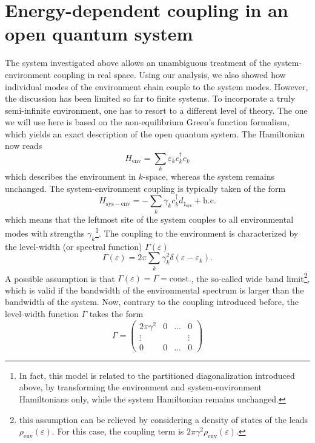 \documentclass{article}
\newcommand{\pdagger}{{\phantom{\dagger}}}
\begin{document}
\section{Energy-dependent coupling in an open quantum system}
The system investigated above allows an unambiguous treatment of the system-environment coupling in real space. Using our analysis, we also showed how individual modes of the environment chain couple to the system modes. However, the discussion has been limited so far to finite systems. To incorporate a truly semi-infinite environment, one has to resort to a different level of theory. The one we will use here is based on the non-equilibrium Green's function formalism, which yields an exact description of the open quantum system. 
The Hamiltonian now reads
\begin{equation}
	H_\mathrm{env} = \sum_k \varepsilon_k c_k^\dagger c_k^\pdagger
\end{equation}
which describes the environment in $k$-space, whereas the system remains unchanged. 
The system-environment coupling is typically taken of the form
\begin{equation}
	H_\mathrm{sys-env} = -\sum_k \gamma_k c_k^\dagger d_{1_\mathrm{sys}} + \mathrm{h.c.}
\end{equation}
which means that the leftmost site of the system couples to all environmental modes with strengths $\gamma_k$\footnote{In fact, this model is related to the partitioned diagonalization introduced above, by transforming the environment  and system-environment Hamiltonians only, while the system Hamiltonian remains unchanged.}. The coupling to the environment is characterized by the level-width (or spectral function) $\Gamma(\varepsilon)$
\begin{equation}
	\Gamma(\varepsilon) = 2\pi \sum_k \gamma_{k}^2\delta(\varepsilon-\varepsilon_k).
\end{equation}
A possible assumption is that $\Gamma(\varepsilon)=\Gamma=\mathrm{const.}$, the so-called wide band limit\footnote{this assumption can be relieved by considering a density of states of the leads $\rho_\mathrm{env}(\varepsilon)$. For this case, the coupling term is $2\pi\gamma^2 \rho_\mathrm{env}(\varepsilon)$.}, which is valid if the bandwidth of the environmental spectrum is larger than the bandwidth of the system. Now, contrary to the coupling introduced before, the level-width function $\Gamma$ takes the form
\begin{equation}
	\Gamma = \begin{pmatrix}
		2\pi \gamma^2 & 0 & \dots & 0\\
		\vdots & & &\vdots\\
		0 & 0 &\dots & 0
	\end{pmatrix}
\end{equation} 
\end{document}
